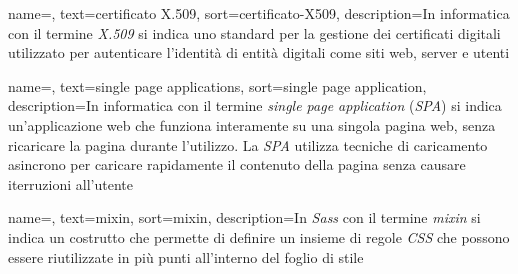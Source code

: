  {
    name=,
    text=certificato X.509,
    sort=certificato-X509,
    description={In informatica con il termine \emph{X.509} si indica uno standard per la gestione dei certificati digitali utilizzato per autenticare l'identità di entità digitali come siti web, server e utenti}
}


 {
    name=,
    text=single page applications,
    sort=single page application,
    description={In informatica con il termine \emph{single page application} (\emph{SPA}) si indica un'applicazione web che funziona interamente su una singola pagina web, senza ricaricare la pagina durante l'utilizzo. La \emph{SPA} utilizza tecniche di caricamento asincrono per caricare rapidamente il contenuto della pagina senza causare iterruzioni all'utente} 
}


 {
    name=,
    text=mixin,
    sort=mixin,
    description={In \emph{Sass} con il termine \emph{mixin} si indica un costrutto che permette di definire un insieme di regole \emph{CSS} che possono essere riutilizzate in più punti all'interno del foglio di stile}
}